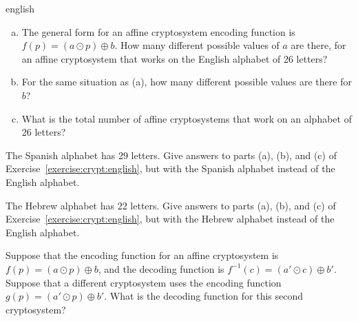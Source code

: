 \begin{exercise}{english}
\begin{enumerate}[(a)]
\item
The general form for an affine cryptosystem encoding function is $f(p) = (a \odot p) \oplus  b$. How many different possible values of $a$ are there, for an affine cryptosystem that works on the English alphabet of 26 letters?
\item
For the same situation as (a), how many different possible values are there for $b$?
\item
What is the total number of affine cryptosystems that work on an alphabet of 26 letters?
\end{enumerate}
\end{exercise}

\begin{exercise}{}
The Spanish alphabet has 29 letters. Give answers to parts (a), (b), and (c) of Exercise~\ref{exercise:crypt:english}, but with the Spanish alphabet instead of the English alphabet.
\end{exercise}

\begin{exercise}{}
The Hebrew alphabet has  22 letters. Give answers to parts (a), (b), and (c) of Exercise~\ref{exercise:crypt:english}, but with the Hebrew alphabet instead of the English alphabet.
\end{exercise}

\begin{exercise}{}
Suppose that the encoding function for an affine cryptosystem is $f(p) = (a \odot p) \oplus  b$, and the decoding function is 
$f^{-1}(c) = (a' \odot c) \oplus  b'$. Suppose that a different cryptosystem uses the encoding function $g(p) = (a' \odot p) \oplus  b'$. What is the decoding function for this second cryptosystem?
\end{exercise}

